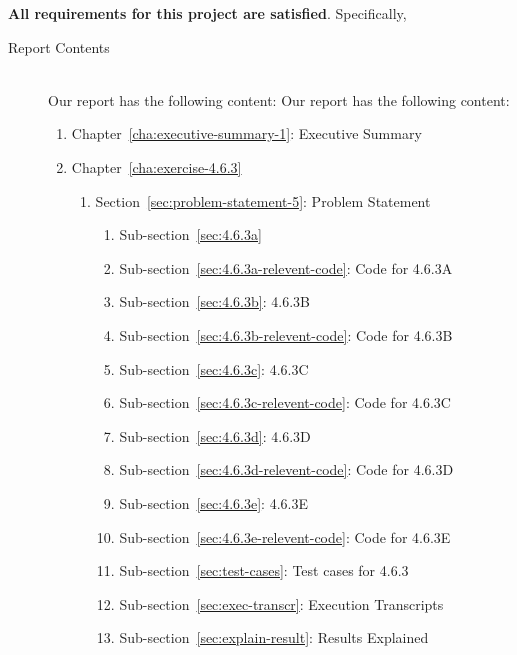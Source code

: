 \documentclass{report}
\begin{document}
\textbf{All requirements for this project are satisfied}.
Specifically,
\begin{description}
\item[Report Contents] \ \\
  Our report has the following content:
  Our report has the following content:
  \begin{enumerate}[{}]

  \item Chapter~\ref{cha:executive-summary-1}: Executive Summary

  \item Chapter~\ref{cha:exercise-4.6.3}
\label{item:1}


    \begin{enumerate}[{}]


    \item Section~\ref{sec:problem-statement-5}: Problem Statement
      \begin{enumerate}[{}]
      \item Sub-section~\ref{sec:4.6.3a}
      \item Sub-section~\ref{sec:4.6.3a-relevent-code}: Code for 4.6.3A
      \item Sub-section~\ref{sec:4.6.3b}: 4.6.3B
      \item Sub-section~\ref{sec:4.6.3b-relevent-code}: Code for 4.6.3B
      \item Sub-section~\ref{sec:4.6.3c}: 4.6.3C
      \item Sub-section~\ref{sec:4.6.3c-relevent-code}: Code for 4.6.3C
      \item Sub-section~\ref{sec:4.6.3d}: 4.6.3D
      \item Sub-section~\ref{sec:4.6.3d-relevent-code}: Code for 4.6.3D
      \item Sub-section~\ref{sec:4.6.3e}: 4.6.3E
      \item Sub-section~\ref{sec:4.6.3e-relevent-code}: Code for 4.6.3E

      \item Sub-section~\ref{sec:test-cases}: Test cases for 4.6.3
      \item Sub-section~\ref{sec:exec-transcr}: Execution Transcripts
      \item Sub-section~\ref{sec:explain-result}: Results Explained
      \end{enumerate}
    

\end{enumerate}
\end{enumerate}
\end{description}
\end{document}
